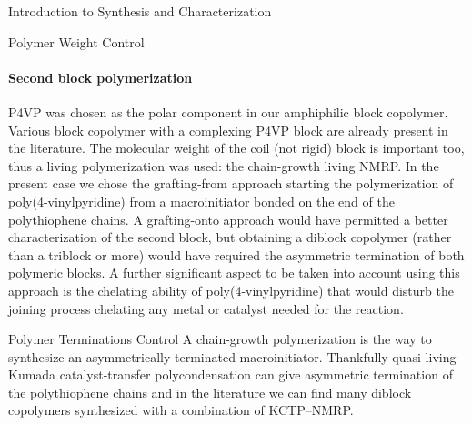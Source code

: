 \begin{section}{Introduction to Synthesis and Characterization}
\begin{subsection}{Polymer Weight Control}
\paragraph{Second block polymerization} \Acrfull{P4VP} was chosen as the polar component in our amphiphilic block copolymer. Various block copolymer with a complexing \acrshort{P4VP} block are already present in the literature. The molecular weight of the coil (not rigid) block is important too, thus a living polymerization was used: the chain-growth living \acrfull{NMRP}. 
In the present case we chose the grafting-from approach starting the polymerization of poly(4-vinyl\-pyridine) from a macroinitiator bonded on the end of the polythiophene chains. 
A grafting-onto 
approach would have permitted a better characterization of the second block, but obtaining a diblock copolymer (rather than a triblock or more) would have required the asymmetric termination of both polymeric blocks. 
A further significant aspect to be taken into account using this approach is the chelating ability of poly(4-vinyl\-pyridine) that would disturb the joining process chelating any metal or catalyst needed for the reaction. 

\end{subsection}
\begin{subsection}{Polymer Terminations Control}
A chain-growth polymerization is the way to synthesize an asymmetrically terminated macroinitiator. Thankfully quasi-living Kumada catalyst-transfer polycondensation can give asymmetric termination of the polythiophene chains and in the literature we can find many diblock copolymers synthesized with a combination of \gls{KCTP}--\gls{NMRP}.


\end{subsection}
\end{section}
